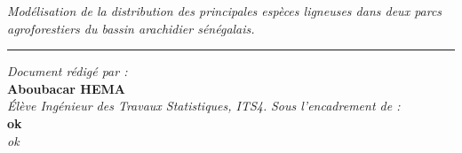 \documentclass[a4paper, oneside, 12pt]{book}
\newcommand{\HRule}{\rule{\linewidth}{0.5mm}}%
\begin{document}
\begin{comment}
	Elève Ingénieur des Travaux Statistiques, ITS 3\\
	\hline\hline
	\end{tabular}\\
	\vspace*{0,4cm}	
	\hspace*{0cm}
    \textcolor{myblue}{\textbf{\textsc{maitre de stage :}}}\\
    \vspace*{0,1cm}
    \hspace*{0cm}
    \begin{tabular}{cc}
	\hline\hline\\
	
\emph{\textbf{M. Nouffou SAWADOGO}}\\
\\

   \textsc{Démographe à l'INSD}
\\
 \hline\hline  
 \end{tabular}\\
 \vspace*{0,1cm}

\end{center}
\begin{center}
\textcolor{myblue}{\textbf{Août 2019}}
\end{center}
\begin{center}
		\begin{tikzpicture}[overlay, remember picture]
		\draw[line width=2.5pt, color=myblue] (-9.5, 26) rectangle (9.5,-1); %
		\draw[line width=2.5pt, color=myblue] (-9.2, 25.7) rectangle (9.2,-0.7);
		\end{tikzpicture}
\end{center}
\end{comment}
	\newpage


\onehalfspacing
\begin{center} \large
\textcolor{bleu}{{\Huge \textit{Modélisation de la distribution des principales espèces ligneuses dans deux parcs agroforestiers
			du bassin arachidier sénégalais.}}\\
\HRule}%
\vfill
\textit{Document rédigé par :}\\
\textbf{Aboubacar HEMA}\\
\textit{Élève Ingénieur des Travaux Statistiques, ITS4.}
\vfill
\textit{Sous l'encadrement de :}\\
\textbf{ok}\\
\textit{ok} \\

\vfill
\end{center}
\end{document}
